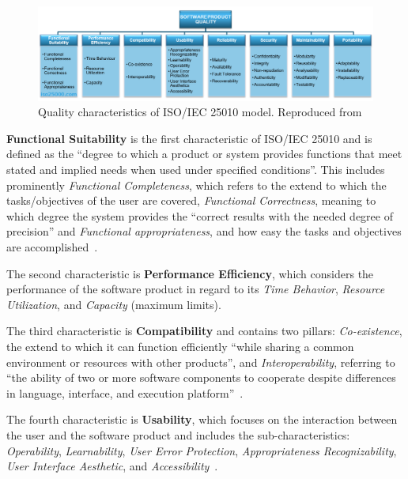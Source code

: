 \begin{figure}
\centering
\includegraphics{images/Untitled_14.png}
\caption{Quality characteristics of ISO/IEC 25010 model. Reproduced from~\cite{iso_25010_online}}
    \label{image_iso_25010_characteristics}
\end{figure}

\textbf{Functional Suitability} is the first characteristic of ISO/IEC 25010 and is defined
as the ``degree to which a product or system provides functions that
meet stated and implied needs when used under specified conditions''\cite{iso_25010_online}.
This includes prominently \textit{Functional Completeness}, which refers to the
extend to which the tasks/objectives of the user are covered, \textit{Functional
Correctness}, meaning to which degree the system provides the ``correct
results with the needed degree of precision''\cite{iso_25010_online} and \textit{Functional appropriateness},
and how easy the tasks and objectives are accomplished~\cite{iso_25010_online}.

The second characteristic is \textbf{Performance Efficiency}, which considers
the performance of the software product in regard to its \textit{Time Behavior},
\textit{Resource Utilization}, and \textit{Capacity} (maximum limits)\cite{iso_25010_online}.

The third characteristic is \textbf{Compatibility} and contains two pillars:
\textit{Co-existence}, the extend to which it can function efficiently
``while sharing a common environment or resources with other products''\cite{iso_25010_online_page_2}, and
\textit{Interoperability}, referring to ``the ability of two or more software
components to cooperate despite differences in language, interface, and
execution platform''~\cite{interoperability}.

The fourth characteristic is \textbf{Usability}, which focuses on the interaction
between the user and the software product and includes the
sub-characteristics: \textit{Operability}, \textit{Learnability}, \textit{User Error Protection},
\textit{Appropriateness Recognizability}, \textit{User Interface Aesthetic}, and
\textit{Accessibility}~\cite{iso_25010_online_page_2}.


